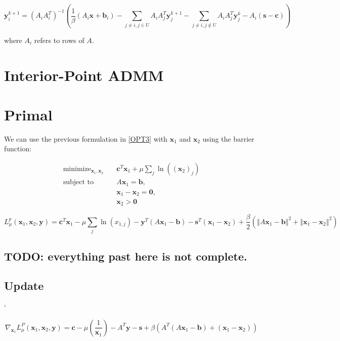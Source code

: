 \documentclass{article}
\begin{document}
\[
\mathbf{y}_{i}^{k+1}=\left(A_{i}A_{i}^{T}\right)^{-1}\left(\frac{1}{\beta}\left(A_{i}\mathbf{x}+\mathbf{b}_{i}\right)-\sum_{j\neq i,j\in U}A_{i}A_{j}^{T}\mathbf{y}_{j}^{k+1}-\sum_{j\neq i,j\notin U}A_{i}A_{j}^{T}\mathbf{y}_{j}^{k}-A_{i}\left(\mathbf{s}-\mathbf{c}\right)\right)
\]


where $A_{i}$ refers to rows of $A$.


\section{Interior-Point ADMM}

\section*{Primal}

We can use the previous formulation in \eqref{OPT3} with  $\mathbf{x}_{1}$ and $\mathbf{x}_{2}$ using the barrier function:

\begin{align}
\text{minimize}_{ \mathbf{x}_{1}, \mathbf{x}_{2}} &\quad \mathbf{c}^T\mathbf{x}_1 + \mu \sum_j \ln((\mathbf{x}_2)_j )\tag{OPT4}\label{OPT4} \\
\text{subject to  \ \  } &\quad  A \mathbf{x}_{1} = \mathbf{b},  \nonumber \\
&\quad \mathbf{x}_{1}  - \mathbf{x}_{2} = \mathbf{0}, \nonumber \\
&\quad \mathbf{x}_{2} > \mathbf{0} \nonumber 
\end{align}

\[
L_{\mu}^{p}(\mathbf{x}_{1},\mathbf{x}_{2},\mathbf{y})=\mathbf{c}^{T}\mathbf{x}_{1}-\mu\sum_{j}\ln\left(x_{1,j}\right)-\mathbf{y}^{T}\left(A\mathbf{x}_{1}-\mathbf{b}\right)-\mathbf{s}^{T}\left(\mathbf{x}_{1}-\mathbf{x}_{2}\right)+\frac{\beta}{2}\left(\left\Vert A\mathbf{x}_{1}-\mathbf{b}\right\Vert ^{2}+\left\Vert \mathbf{x}_{1}-\mathbf{x}_{2}\right\Vert ^{2}\right)
\]



\subsection*{TODO: everything past here is not complete.}


\subsection*{Update}
`

\[
\nabla_{\mathbf{x}_{1}}L_{\mu}^{P}(\mathbf{x}_{1},\mathbf{x}_{2},\mathbf{y})=\mathbf{c}-\mu\left(\frac{1}{\mathbf{x}_{1}}\right)-A^{T}\mathbf{y}-\mathbf{s}+\beta\left(A^{T}\left(A\mathbf{x}_{1}-\mathbf{b}\right)+\left(\mathbf{x}_{1}-\mathbf{x}_{2}\right)\right)
\]
\end{document}
